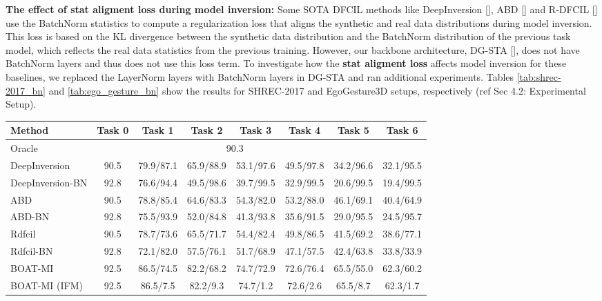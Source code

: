 \documentclass[11pt]{article}
\begin{document}
\textbf{The effect of stat aligment loss during model inversion:} Some SOTA DFCIL methods like DeepInversion [], ABD [] and R-DFCIL [] use the BatchNorm statistics to compute a regularization loss that aligns the synthetic and real data distributions during model inversion. This loss is based on the KL divergence between the synthetic data distribution and the BatchNorm distribution of the previous task model, which reflects the real data statistics from the previous training. However, our backbone architecture, DG-STA [], does not have BatchNorm layers and thus does not use this loss term. To investigate how the \textbf{stat aligment loss} affects model inversion for these baselines, we replaced the LayerNorm layers with BatchNorm layers in DG-STA and ran additional experiments. Tables \ref{tab:shrec-2017_bn} and \ref{tab:ego_gesture_bn} show the results for SHREC-2017 and EgoGesture3D setups, respectively (ref Sec 4.2: Experimental Setup).



\begin{table*}[h]
\centering
\caption{ \textbf{(BN Results)} for class-incremental learning on six task SHREC-2017.}
\begin{tabular}{lccccccc}
\toprule
            Method &    Task 0 &    Task 1 &    Task 2 &    Task 3 &    Task 4 &    Task 5 &    Task 6 \\
\midrule
            Oracle &      \multicolumn{6}{c}{90.3} \\
\midrule            
        DeepInversion & 90.5 & 79.9/87.1 & 65.9/88.9 & 53.1/97.6 & 49.5/97.8 & 34.2/96.6  & 32.1/95.5 \\
     DeepInversion-BN & 92.8 & 76.6/94.4 & 49.5/98.6 &  39.7/99.5 &  32.9/99.5 & 20.6/99.5 & 19.4/99.5 \\
                  ABD & 90.5 & 78.8/85.4 & 64.6/83.3 & 54.3/82.0 & 53.2/88.0 & 46.1/69.1  & 40.4/64.9 \\
               ABD-BN & 92.8 & 75.5/93.9 & 52.0/84.8 &  41.3/93.8 &  35.6/91.5 & 29.0/95.5 & 24.5/95.7 \\
               Rdfcil & 90.5 & 78.7/73.6 & 65.5/71.7 & 54.4/82.4 & 49.8/86.5 & 41.5/69.2 & 38.6/77.1 \\
            Rdfcil-BN & 92.8 & 72.1/82.0 & 57.5/76.1 &  51.7/68.9 &  47.1/57.5 & 42.4/63.8 & 33.8/33.9 \\
\midrule 
        BOAT-MI &   92.5 & 86.5/74.5 & 82.2/68.2 & 74.7/72.9 & 72.6/76.4 & 65.5/55.0 & 62.3/60.2 \\
        BOAT-MI (IFM) &   92.5 & 86.5/7.5 & 82.2/9.3 & 74.7/1.2 & 72.6/2.6 & 65.5/8.7 & 62.3/1.7 \\      
\bottomrule
\end{tabular}
\label{tab:shrec-2017_bn}
\end{table*}
\end{document}
